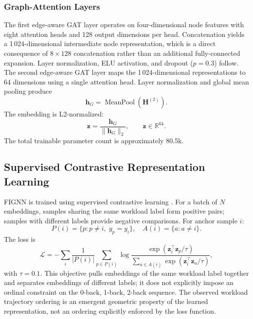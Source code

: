 \documentclass{ieeeaccess}
\begin{document}
\subsubsection{Graph-Attention Layers}
The first edge-aware GAT layer operates on four-dimensional node features with
eight attention heads and 128 output dimensions per head. Concatenation yields
a 1\,024-dimensional intermediate node representation, which is a direct
consequence of $8 \times 128$ concatenation rather than an additional
fully-connected expansion. Layer normalization, ELU activation, and dropout
($p=0.3$) follow. The second edge-aware GAT layer maps the 1\,024-dimensional
representations to 64 dimensions using a single attention head. Layer
normalization and global mean pooling produce
\begin{equation}
  \mathbf{h}_G = \operatorname{MeanPool}\!\left(\mathbf{H}^{(2)}\right).
\end{equation}
The embedding is L2-normalized:
\begin{equation}
  \mathbf{z}
  = \frac{\mathbf{h}_G}{\|\mathbf{h}_G\|_2},
  \qquad
  \mathbf{z} \in \mathbb{R}^{64}.
\end{equation}
The total trainable parameter count is approximately 80.5k.

\subsection{Supervised Contrastive Representation Learning}

FIGNN is trained using supervised contrastive learning \cite{khosla2020}.
For a batch of $N$ embeddings, samples sharing the same workload label form
positive pairs; samples with different labels provide negative comparisons.
For anchor sample $i$:
\begin{equation}
  P(i) = \{p : p \neq i,\; y_p = y_i\}, \quad
  A(i) = \{a : a \neq i\}.
\end{equation}
The loss is
\begin{equation}
  \mathcal{L}
  = -\sum_i
    \frac{1}{|P(i)|}
    \sum_{p \in P(i)}
    \log
    \frac{
      \exp(\mathbf{z}_i^{\top}\mathbf{z}_p / \tau)
    }{
      \displaystyle\sum_{a \in A(i)}
      \exp(\mathbf{z}_i^{\top}\mathbf{z}_a / \tau)
    },
  \label{eq:supcon}
\end{equation}
with $\tau = 0.1$. This objective pulls embeddings of the same workload label
together and separates embeddings of different labels; it does not explicitly
impose an ordinal constraint on the 0-back, 1-back, 2-back sequence. The
observed workload trajectory ordering is an emergent geometric property of the
learned representation, not an ordering explicitly enforced by the loss
function.
\end{document}
